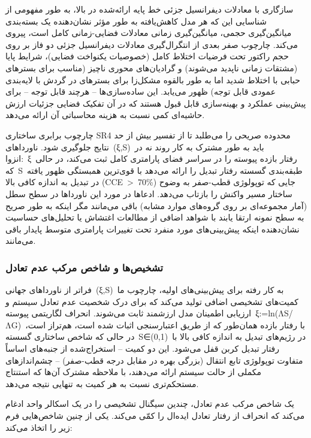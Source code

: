 \documentclass[12pt, a4paper]{article}
\begin{document}
سازگاری با معادلات دیفرانسیل جزئی خط پایه ارائه‌شده در بالا، به طور مفهومی از شناسایی این که هر مدل کاهش‌یافته به طور مؤثر نشان‌دهنده یک بسته‌بندی میانگین‌گیری حجمی، میانگین‌گیری زمانی معادلات فضایی-زمانی کامل است، پیروی می‌کند. چارچوب صفر بعدی از انتگرال‌گیری معادلات دیفرانسیل جزئی دو فاز بر روی حجم راکتور تحت فرضیات اختلاط کامل (خصوصیات یکنواخت فضایی)، شرایط پایا (مشتقات زمانی ناپدید می‌شوند) و گرادیان‌های محوری ناچیز (مناسب برای بسترهای حبابی با اختلاط شدید اما به طور بالقوه مشکل‌زا برای بسترهای در گردش با لایه‌بندی عمودی قابل توجه) ظهور می‌یابد. این ساده‌سازی‌ها – هرچند قابل توجه – برای پیش‌بینی عملکرد و بهینه‌سازی قابل قبول هستند که در آن تفکیک فضایی جزئیات ارزش حاشیه‌ای کمی نسبت به هزینه محاسباتی آن ارائه می‌دهد.

چارچوب برابری ساختاری SR4 محدوده صریحی را می‌طلبد تا از تفسیر بیش از حد نتایج جلوگیری شود. ناورداهای (ξ,S) باید به طور مشترک به کار روند نه در انزوا: ξ رفتار بازده پیوسته را در سراسر فضای پارامتری کامل ثبت می‌کند، در حالی که S طبقه‌بندی گسسته رفتار تبدیل را ارائه می‌دهد با قوی‌ترین همبستگی ظهور یافته در تبدیل به اندازه کافی بالا (CCE > 70\%) جایی که توپولوژی قطب-صفر به وضوح ساختار مسیر واکنش را بازتاب می‌دهد. ادعاها در مورد این ناورداها در سطح سطل (آمار مجموعه‌ای بر روی گروه‌های موارد مشابه) باقی می‌مانند مگر اینکه به طور صریح به سطح نمونه ارتقا یابند با شواهد اضافی از مطالعات اغتشاش یا تحلیل‌های حساسیت نشان‌دهنده اینکه پیش‌بینی‌های مورد منفرد تحت تغییرات پارامتری متوسط پایدار باقی می‌مانند.

\subsubsection{تشخیص‌ها و شاخص مرکب عدم تعادل}

فراتر از ناورداهای جهانی (ξ,S) به کار رفته برای پیش‌بینی‌های اولیه، چارچوب ما کمیت‌های تشخیصی اضافی تولید می‌کند که برای درک شخصیت عدم تعادل سیستم و ارزیابی اطمینان مدل ارزشمند ثابت می‌شوند. انحراف لگاریتمی پیوسته ξ:=ln(ΛS/ΛG) با رفتار بازده همان‌طور که از طریق اعتبارسنجی اثبات شده است، هم‌تراز است، در حالی که شاخص ساختاری گسسته S∈(0,1) در رژیم‌های تبدیل به اندازه کافی بالا با رفتار تبدیل کربن قفل می‌شود. این دو کمیت – استخراج‌شده از جنبه‌های اساساً متفاوت توپولوژی تابع انتقال (بزرگی بهره در مقابل درجه قطب-صفر) – چشم‌اندازهای مکملی از حالت سیستم ارائه می‌دهند، با ملاحظه مشترک آن‌ها که استنتاج مستحکم‌تری نسبت به هر کمیت به تنهایی نتیجه می‌دهد.

یک شاخص مرکب عدم تعادل، چندین سیگنال تشخیصی را در یک اسکالر واحد ادغام می‌کند که انحراف از رفتار تعادل ایده‌ال را کمّی می‌کند. یکی از چنین شاخص‌هایی فرم زیر را اتخاذ می‌کند:
\end{document}

